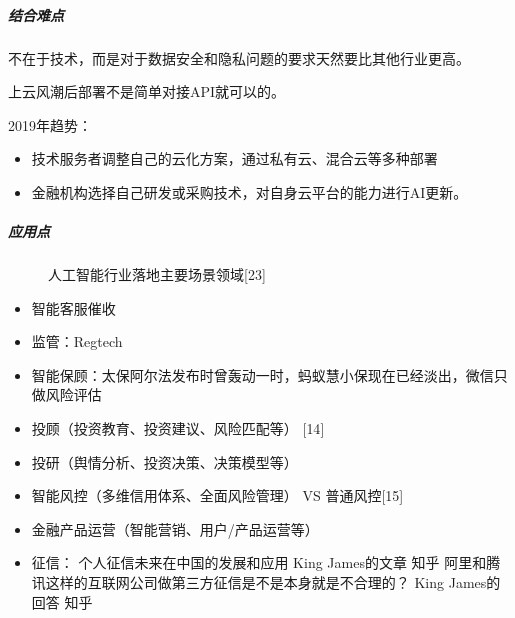 \documentclass[letterpaper,10pt,english]{sphinxmanual}
\begin{document}
\subparagraph{结合难点}
\label{\detokenize{chapter_project/AI_Finance:id2}}
不在于技术，而是对于数据安全和隐私问题的要求天然要比其他行业更高。

上云风潮后部署不是简单对接API就可以的。

2019年趋势：
\begin{itemize}
\item {} 
技术服务者调整自己的云化方案，通过私有云、混合云等多种部署

\item {} 
金融机构选择自己研发或采购技术，对自身云平台的能力进行AI更新。

\end{itemize}


\subparagraph{应用点}
\label{\detokenize{chapter_project/AI_Finance:id3}}
\begin{figure}[H]
\centering
\capstart

\noindent{}
\caption{人工智能行业落地主要场景领域{[}23{]}}\label{\detokenize{chapter_project/AI_Finance:id32}}\end{figure}
\begin{itemize}
\item {} 
智能客服催收

\item {} 
监管：Regtech

\item {} 
智能保顾：太保阿尔法发布时曾轰动一时，蚂蚁慧小保现在已经淡出，微信只做风险评估

\item {} 
投顾（投资教育、投资建议、风险匹配等） {[}14{]}

\item {} 
投研（舆情分析、投资决策、决策模型等）

\item {} 
智能风控（多维信用体系、全面风险管理） VS 普通风控{[}15{]}

\item {} 
金融产品运营（智能营销、用户/产品运营等）

\item {} 
征信： 个人征信未来在中国的发展和应用 \sphinxhyphen{} King James的文章 \sphinxhyphen{} 知乎
阿里和腾讯这样的互联网公司做第三方征信是不是本身就是不合理的？ \sphinxhyphen{} King
James的回答 \sphinxhyphen{} 知乎

\end{itemize}
\end{document}

